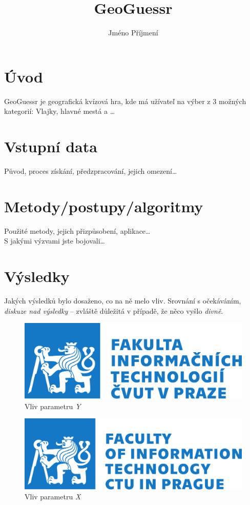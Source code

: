 \documentclass[czech]{pyt-report}
\title{GeoGuessr}
\author{Jméno Příjmení}
\affiliation{ČVUT--FIT}
\begin{document}
\maketitle

\section{Úvod}
GeoGuessr je geografická kvízová hra, kde má užívateľ na výber z 3 možných kategorií: Vlajky, hlavné mestá a  \ldots


\section{Vstupní data}
Původ, proces získání, předzpracování, jejich omezení\ldots

\section{Metody/postupy/algoritmy}
Použité metody, jejich přizpůsobení, aplikace\ldots \\
S jakými výzvami jste bojovali\ldots

\section{Výsledky}

Jakých výsledků bylo dosaženo, co na ně melo vliv. Srovnání s očekáváním, \emph{diskuze nad výsledky} -- zvláště důležitá v případě, že něco vyšlo \emph{divně}.

\begin{figure}[h]
  \centering\leavevmode
  \includegraphics[width=.45\linewidth]{img/fit-logo-cz.pdf}\vskip-0.5cm
  \caption{Vliv parametru \emph{Y}}
  \label{fig:par-y}
\end{figure}
\begin{figure}[h]
  \centering\leavevmode
  \includegraphics[width=.45\linewidth]{img/fit-logo-en.pdf}\vskip-0.5cm
  \caption{Vliv parametru \emph{X}}
  \label{fig:par-x}
\end{figure}
\end{document}
